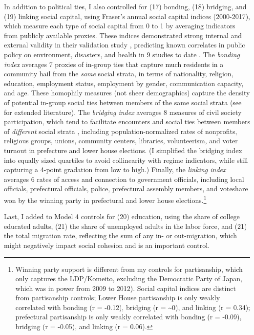 \documentclass[preprint, 3p,
authoryear]{elsarticle} %
\begin{document}
In addition to political ties, I also controlled for (17) bonding, (18)
bridging, and (19) linking social capital, using Fraser's annual social
capital indices (2000-2017), which measure each type of social capital
from 0 to 1 by averaging indicators from publicly available proxies.
These indices demonstrated strong internal and external validity in
their validation study \citep{fraser_2021_IJDRR}, predicting known
correlates in public policy on environment, disasters, and health in 9
studies to date
\citep[eg.][]{fraser_et_al_2020, fraser_and_aldrich_2021_SR, fraser_et_al_2021_CRM, fraser_et_al_2022_EIST}.
The \emph{bonding index} averages 7 proxies of in-group ties that
capture much residents in a community hail from the \emph{same} social
strata, in terms of nationality, religion, education, employment status,
employment by gender, communication capacity, and age. These homophily
measures (not sheer demographics) capture the density of potential
in-group social ties between members of the same social strata (see
\citet{fraser_2021_IJDRR} for extended literature). The \emph{bridging
index} averages 8 measures of civil society participation, which tend to
facilitate encounters and social ties between members of
\emph{different} social strata \citep{putnam_2000}, including
population-normalized rates of nonprofits, religious groups, unions,
community centers, libraries, volunteerism, and voter turnout in
prefecture and lower house elections. (I simplified the bridging index
into equally sized quartiles to avoid collinearity with regime
indicators, while still capturing a 4-point gradation from low to high.)
Finally, the \emph{linking index} averages 6 rates of access and
connection to government officials, including local officials,
prefectural officials, police, prefectural assembly members, and
voteshare won by the winning party in prefectural and lower house
elections.\footnote{Winning party support is different from my controls
  for partisanship, which only captures the LDP/Komeito, excluding the
  Democratic Party of Japan, which was in power from 2009 to 2012).
  Social capital indices are distinct from partisanship controls; Lower
  House partisanship is only weakly correlated with bonding (r = -0.12),
  bridging (r = \textasciitilde0), and linking (r = 0.34); prefectural
  partisanship is only weakly correlated with bonding (r = -0.09),
  bridging (r = -0.05), and linking (r = 0.06).}

Last, I added to Model 4 controls for (20) education, using the share of
college educated adults, (21) the share of unemployed adults in the
labor force, and (21) the total migration rate, reflecting the sum of
any in- or out-migration, which might negatively impact social cohesion
and is an important control.
\end{document}
